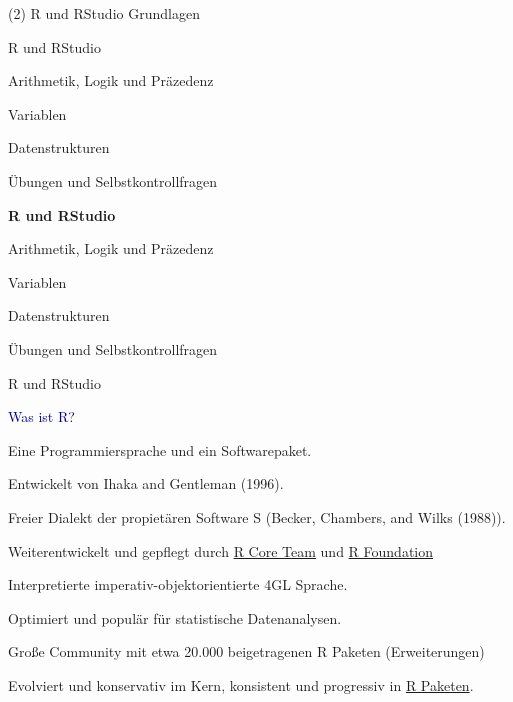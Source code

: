 \documentclass[
  8pt,
  ignorenonframetext,
]{beamer}
\begin{document}
\begin{frame}[plain]{}
\protect\hypertarget{section-1}{}
\vfill
\huge
\begin{center}
(2) R und RStudio Grundlagen
\end{center}
\vfill
\end{frame}

\begin{frame}{}
\protect\hypertarget{section-2}{}
\large
\vfill
{}

R und RStudio

Arithmetik, Logik und Präzedenz

Variablen

Datenstrukturen

Übungen und Selbstkontrollfragen
\end{frame}

\begin{frame}{}
\protect\hypertarget{section-3}{}
\large
\vfill
{}

\textbf{R und RStudio}

Arithmetik, Logik und Präzedenz

Variablen

Datenstrukturen

Übungen und Selbstkontrollfragen
\end{frame}

\begin{frame}{R und RStudio}
\protect\hypertarget{r-und-rstudio}{}
\large

\textcolor{darkblue}{Was ist R?}

\normalsize

Eine Programmiersprache und ein Softwarepaket.

Entwickelt von Ihaka and Gentleman (1996).

Freier Dialekt der propietären Software S (Becker, Chambers, and Wilks
(1988)).

Weiterentwickelt und gepflegt durch
\href{https://www.r-project.org/contributors.html}{R Core Team} und
\href{https://www.r-project.org/foundation/}{R Foundation}

Interpretierte imperativ-objektorientierte 4GL Sprache.

Optimiert und populär für statistische Datenanalysen.

Große Community mit etwa 20.000 beigetragenen R Paketen (Erweiterungen)

Evolviert und konservativ im Kern, konsistent und progressiv in
\href{https://cran.r-project.org/web/packages/}{R Paketen}.
\end{frame}
\end{document}
